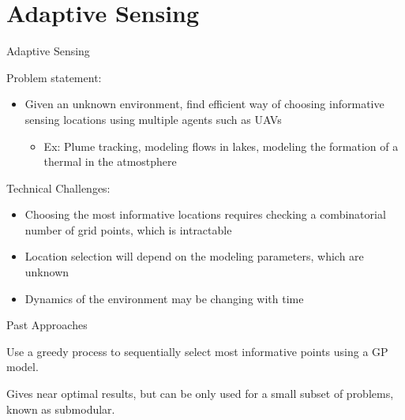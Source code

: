\documentclass[11pt,mathserif]{beamer}
\begin{document}
\section[Adaptive Sensing]{Adaptive Sensing}
\begin{frame}[t]{Adaptive Sensing}
\bi
\item Problem statement:
\begin{itemize}
\item Given an unknown environment, find efficient way of choosing informative sensing locations using multiple agents such as UAVs
\begin{itemize}
                  \item Ex: Plume tracking, modeling flows in lakes, modeling the formation of a thermal in the atmostphere
		\end{itemize}
\end{itemize}

\item Technical Challenges:
\begin{itemize}
\item Choosing the most informative locations requires checking a combinatorial number of grid points, which is intractable
\item Location selection will depend on the modeling parameters, which are unknown
\item Dynamics of the environment may be changing with time
\end{itemize}
\item Past Approaches
\bi
\item Use a greedy process to sequentially select most informative points using a GP model.
\bi
\item Gives near optimal results, but can be only used for a small subset of problems, known as submodular.
\ei
\ei
\ei

\end{frame}
\end{document}
